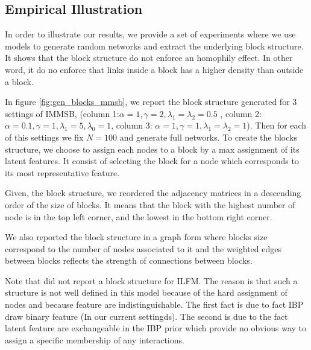 \subsection{Empirical Illustration}
\label{subsec:mg}

In order to illustrate our results, we provide a set of experiments where we use models to generate random networks and extract the underlying block structure. It shows that the block structure do not enforce an homophily effect. In other word, it do no enforce that links inside a block has a higher density than outside a block.

In figure \ref{fig:gen_blocks_mmsb}, we report the block structure  generated for 3 settings of IMMSB, (column 1:$\alpha=1, \gamma=2, \lambda_1=\lambda_2=0.5$ , column 2:$\alpha=0.1, \gamma=1, \lambda_1=5, \lambda_0=1$, column 3: $\alpha=1, \gamma=1, \lambda_1=\lambda_2=1$). Then for each of this settings we fix $N=100$ and generate full networks. To create the blocks structure, we choose to assign each nodes to a block by a max assignment of its latent features. It consist of selecting the block for a node which corresponds to its most representative feature.


Given, the block structure, we reordered the adjacency matrices in a descending order of the size of blocks. It means that the block with the highest number of node is in the top left corner, and the lowest in the bottom right corner.

We also reported the block structure in a graph form where blocks size correspond to the number of nodes associated to it and the weighted edges between blocks reflects the strength of connections between blocks.

Note that did not report a block structure for ILFM. The reason is that such a structure is not well defined in this model because of the hard assignment of nodes and because feature are indistinguishable. The first fact is due to fact IBP draw binary feature (In our current settingds). The second is due to the fact latent feature are exchangeable in the IBP prior which provide no obvious way to assign a specific membership of any interactions. 

